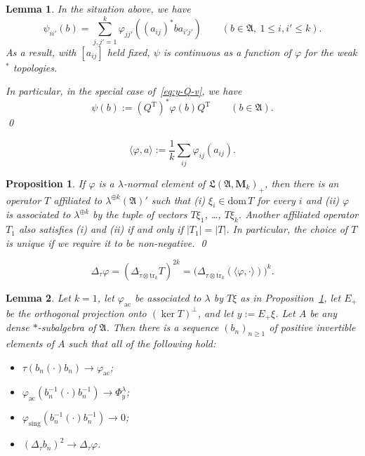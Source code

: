 \documentclass[10pt,a4paper]{amsart}
\newtheorem{lem}{Lemma}
\newtheorem{prop}{Proposition}
\newcommand{\A}{\mathfrak{A}}
\newcommand{\dom}{\mathrm{dom}\,}
\newcommand{\frL}{\mathfrak{L}}
\renewcommand{\l}{\lambda}
\renewcommand{\phi}{\varphi}
\renewcommand{\rm}[1]{\mathrm{#1}}
\newcommand{\rmM}{\mathbf{M}}
\renewcommand{\t}[1]{\widetilde{#1}}
\newcommand{\tr}{\overline{\mathrm{tr}}}
\begin{document}
\begin{lem}\label{lem:new-type}
In the situation above, we have
\begin{equation}\label{eq:new-type}
\psi_{ii'}(b) = \sum_{j,j'=1}^k \phi_{jj'}((a_{ij})^\ast ba_{i'j'}) \qquad (b \in \A,\ 1\le i,i'\le k).
\end{equation}
As a result, with $[a_{ij}]$ held fixed, $\psi$ is continuous as a function of $\phi$ for the weak$^\ast$ topologies.

In particular, in the special case of~\eqref{eq:y-Q-v}, we have
	\begin{equation}\label{eq:psi-Q-phi}
\psi(b) := (Q^\rm{T})^\ast\phi(b)Q^\rm{T} \qquad (b \in \A).
	\end{equation}
\qed
\end{lem}

\begin{equation}\label{eq:pairing}
	\langle \phi,a\rangle := \frac{1}{k}\sum_{ij}\phi_{ij}(a_{ij}).
\end{equation}

\begin{prop}\label{prop:RadNik}
If $\phi$ is a $\l$-normal element of $\frL(\A,\rmM_k)_+$, then there is an operator $T$ affiliated to $\l^{\oplus k}(\A)'$ such that (i) $\xi_i \in \dom T$ for every $i$ and (ii) $\phi$ is associated to $\l^{\oplus k}$ by the tuple of vectors $T\xi_1$, \dots, $T\xi_k$.  Another affiliated operator $T_1$ also satisfies (i) and (ii) if and only if $|T_1| = |T|$.  In particular, the choice of $T$ is unique if we require it to be non-negative. \qed
\end{prop}

\begin{equation}\label{eq:det-phi-det-pairing}
\Delta_\tau \phi = (\Delta_{\t{\tau}\otimes \tr_k} T)^{2k} = \big(\Delta_{\tau\otimes \tr_k}(\langle \phi,\cdot\rangle)\big)^k.
\end{equation}

\begin{lem}\label{lem:Kap+2}
Let $k=1$, let $\phi_{\rm{ac}}$ be associated to $\l$ by $T\xi$ as in Proposition~\ref{prop:RadNik}, let $E_+$ be the orthogonal projection onto $(\ker T)^\perp$, and let $y := E_+\xi$.  Let $A$ be any dense $\ast$-subalgebra of $\A$. Then there is a sequence $(b_n)_{n\ge 1}$ of positive invertible elements of $A$ such that all of the following hold:
\begin{itemize}
\item[i.] $\tau(b_n(\cdot)b_n) \to \phi_{\rm{ac}}$;
\item[ii.] $\phi_{\rm{ac}}(b_n^{-1}(\cdot) b_n^{-1}) \to \Phi^\l_y$;
\item[iii.] $\phi_{\rm{sing}}(b_n^{-1}(\cdot) b_n^{-1}) \to 0$;
\item[iv.] $(\Delta_\tau b_n)^2 \to \Delta_\tau \phi$.
\end{itemize}
\end{lem}
\end{document}
